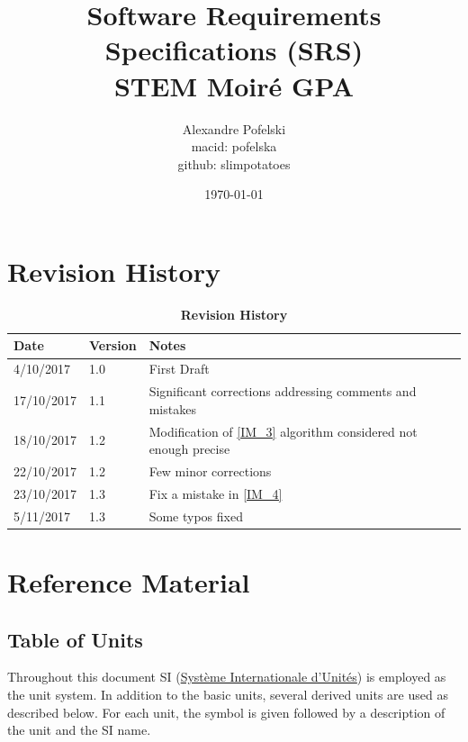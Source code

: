 \documentclass[12pt]{article}
\begin{document}
\title{Software Requirements Specifications (SRS) \\
STEM Moir{\'e} GPA} 
\author{Alexandre Pofelski \\
		macid: pofelska \\
		github: slimpotatoes}
\date{\today}

\maketitle

\clearpage

\tableofcontents

\clearpage

\section{Revision History}

\begin{table}[h]
\caption{\bf Revision History}
\begin{tabularx}{\textwidth}{p{3cm}p{2cm}X}
\toprule {\bf Date} & {\bf Version} & {\bf Notes}\\
\midrule
4/10/2017 & 1.0 & First Draft\\
17/10/2017 & 1.1 & Significant corrections addressing comments and mistakes\\
18/10/2017 & 1.2 & Modification of \cref{IM_3} algorithm considered not enough precise\\
22/10/2017 & 1.2 & Few minor corrections\\
23/10/2017 & 1.3 & Fix a mistake in \cref{IM_4}\\
5/11/2017 & 1.3 & Some typos fixed\\
\bottomrule
\end{tabularx}
\end{table}

\clearpage

\section{Reference Material}

\subsection{Table of Units}

Throughout this document SI 
(\href{<https://physics.nist.gov/cuu/Units/index.html>}{Syst\`{e}me 
Internationale d'Unit\'{e}s}) is employed as the unit system. In addition to the 
basic units, several derived units are used as described below.  For each unit, 
the symbol is given followed by a description of the unit and the SI name.\par 
\bigskip
\end{document}
